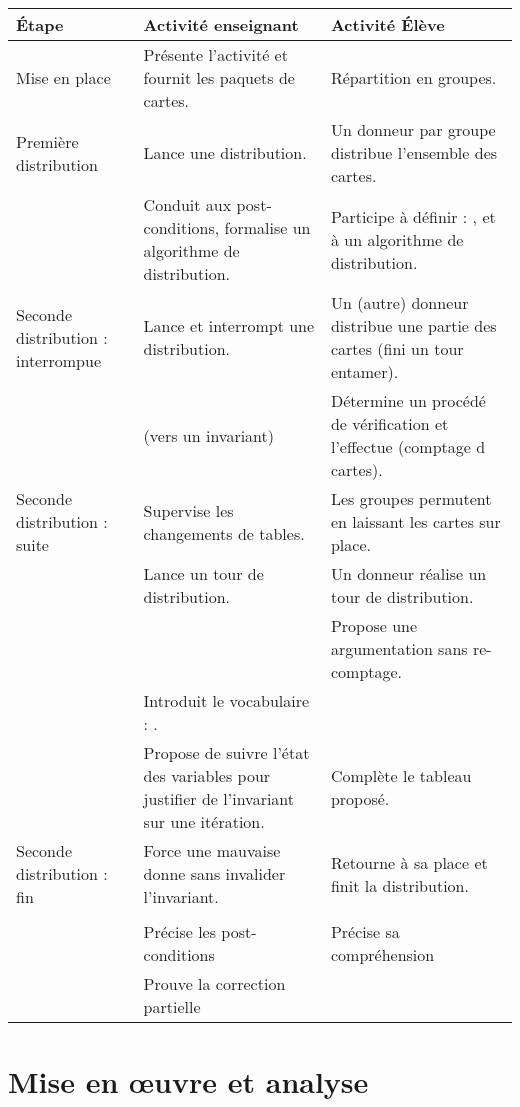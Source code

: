 {\centering\begin{longtable}{|C{3cm}|L{6cm}|L{6cm}|}\hline
{}Étape & Activité enseignant & Activité Élève  \\ \hline\endhead
Mise en place
& Présente l'activité et fournit les paquets de cartes.
& Répartition en groupes.
\\ \hline
{} Première distribution
& Lance une distribution.
& Un donneur par groupe distribue l'ensemble des cartes. 
\\ 
& Conduit aux post-conditions, formalise un algorithme de distribution.
& Participe à définir : , et à un algorithme de distribution.
\\ \hline
{} Seconde distribution : interrompue
& Lance et interrompt une distribution.
& Un (autre) donneur distribue une partie des cartes (fini un tour entamer). 
\\ 
&  (vers un invariant)
& Détermine un procédé de vérification et l'effectue (comptage d cartes).
\\ \hline
{} Seconde distribution : suite
& Supervise les changements de tables.
& Les groupes permutent en laissant les cartes sur place. 
\\ 
& Lance un tour de distribution.
& Un donneur réalise un tour de distribution. 
\\ 
& 
& Propose une argumentation sans re-comptage.
\\ 
& Introduit le vocabulaire : .
& 
\\ 
& Propose de suivre l'état des variables pour justifier de l'invariant sur une itération.
& Complète le tableau proposé.
\\ \hline
{} Seconde distribution : fin
& Force une mauvaise donne sans invalider l'invariant.
& Retourne à sa place et finit la distribution. 
\\ 
& 
&  
\\ 
& Précise les post-conditions
& Précise sa compréhension
\\ 
& Prouve la correction partielle
& 
\\ \hline
\end{longtable}\par}

\section{Mise en œuvre et analyse}

